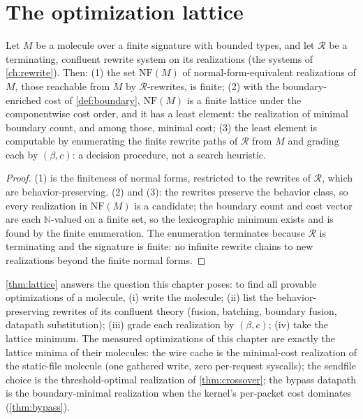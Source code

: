 \section{The optimization lattice}\label{sec:lattice}

\begin{theorem}\label{thm:lattice}
Let $M$ be a molecule over a finite signature with bounded types, and
let $\mathcal{R}$ be a terminating, confluent rewrite system on its
realizations (the systems of \autoref{ch:rewrite}). Then:
(1) the set $\mathrm{NF} (M)$ of normal-form-equivalent realizations of
$M$, those reachable from $M$ by $\mathcal{R}$-rewrites, is finite;
(2) with the boundary-enriched cost of \autoref{def:boundary},
$\mathrm{NF} (M)$ is a finite lattice under the componentwise cost
order, and it has a least element: the realization of minimal boundary
count, and among those, minimal cost;
(3) the least element is computable by enumerating the finite rewrite
paths of $\mathcal{R}$ from $M$ and grading each by $(\beta, c)$: a
decision procedure, not a search heuristic.
\end{theorem}

\begin{proof}
(1) is the finiteness of normal forms, restricted to the rewrites of
$\mathcal{R}$, which are behavior-preserving. (2) and (3): the
rewrites preserve the behavior class, so every realization in
$\mathrm{NF} (M)$ is a candidate; the boundary count and cost vector are
each $\mathbb{N}$-valued on a finite set, so the lexicographic minimum
exists and is found by the finite enumeration. The enumeration
terminates because $\mathcal{R}$ is terminating and the signature is
finite: no infinite rewrite chains to new realizations beyond the
finite normal forms.
\end{proof}

\begin{remark}
\autoref{thm:lattice} answers the question this chapter poses: to find
all provable optimizations of a molecule, (i) write the molecule;
(ii) list the behavior-preserving rewrites of its confluent theory
(fusion, batching, boundary fusion, datapath substitution); (iii) grade
each realization by $(\beta, c)$; (iv) take the lattice minimum. The
measured optimizations of this chapter are exactly the lattice minima
of their molecules: the wire cache is the minimal-cost realization of
the static-file molecule (one gathered write, zero per-request
syscalls); the sendfile choice is the threshold-optimal realization of
\autoref{thm:crossover}; the bypass datapath is the boundary-minimal
realization when the kernel's per-packet cost dominates
(\autoref{thm:bypass}).
\end{remark}

